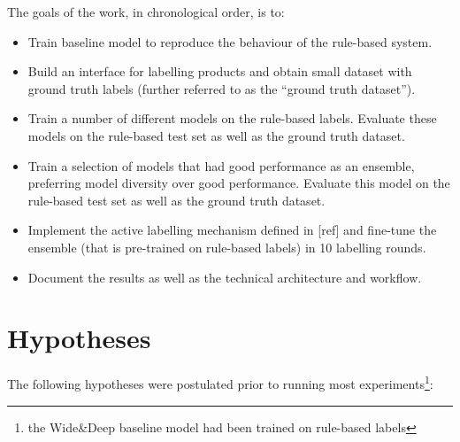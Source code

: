 The goals of the work, in chronological order, is to:

\begin{itemize}
  \item Train  baseline model to reproduce the behaviour of the rule-based system.
  \item Build an interface for labelling products and obtain small dataset with ground truth labels (further referred to as the ``ground truth dataset'').
  \item Train a number of different models on the rule-based labels.  Evaluate these models on the rule-based test set as well as the ground truth dataset.
  \item Train a selection of models that had good performance as an ensemble, preferring model diversity over good performance. Evaluate this model on the rule-based test set as well as the ground truth dataset.
  \item Implement the active labelling mechanism defined in [ref] and fine-tune the ensemble (that is pre-trained on rule-based labels) in 10 labelling rounds.
  \item Document the results as well as the technical architecture and workflow.
\end{itemize}

\section{Hypotheses}

The following hypotheses were postulated prior to running most experiments\footnote{the Wide\&Deep baseline model had been trained on rule-based labels}:

